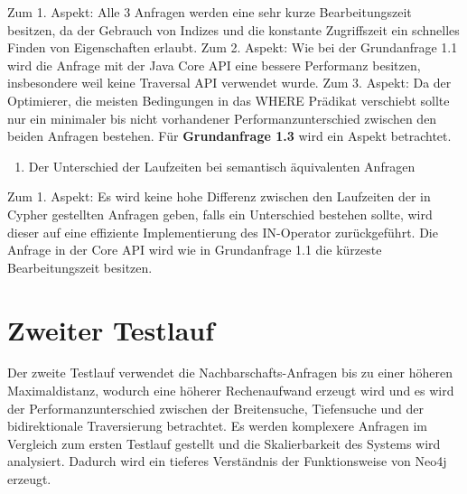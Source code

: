 Zum 1. Aspekt: Alle 3 Anfragen werden eine sehr kurze Bearbeitungszeit besitzen, da der Gebrauch von Indizes und die konstante Zugriffszeit ein schnelles Finden von Eigenschaften erlaubt. \newline
Zum 2. Aspekt: Wie bei der Grundanfrage 1.1 wird   die Anfrage mit der Java Core API eine bessere Performanz besitzen, insbesondere weil keine Traversal API verwendet wurde. \newline
Zum 3. Aspekt: Da der Optimierer, die meisten Bedingungen in das WHERE Prädikat verschiebt sollte nur ein minimaler bis nicht vorhandener Performanzunterschied zwischen den beiden Anfragen bestehen. \newline \newline
Für \textbf{Grundanfrage 1.3} wird ein Aspekt betrachtet.
\begin{enumerate}
	\item Der Unterschied der Laufzeiten bei semantisch äquivalenten Anfragen 
\end{enumerate}
Zum 1. Aspekt: Es wird keine hohe Differenz zwischen den Laufzeiten der in Cypher gestellten Anfragen geben, falls ein Unterschied bestehen sollte, wird dieser auf eine effiziente Implementierung des IN-Operator zurückgeführt. Die Anfrage in der Core API wird wie in Grundanfrage 1.1 die kürzeste Bearbeitungszeit besitzen.

\section{Zweiter Testlauf}
Der zweite Testlauf verwendet die Nachbarschafts-Anfragen bis zu einer höheren Maximaldistanz, wodurch eine höherer Rechenaufwand erzeugt wird und es wird der Performanzunterschied zwischen der Breitensuche, Tiefensuche und der bidirektionale Traversierung betrachtet. Es werden komplexere Anfragen im Vergleich zum ersten Testlauf gestellt und die Skalierbarkeit des Systems wird analysiert. Dadurch wird ein tieferes Verständnis der Funktionsweise von Neo4j erzeugt. 
